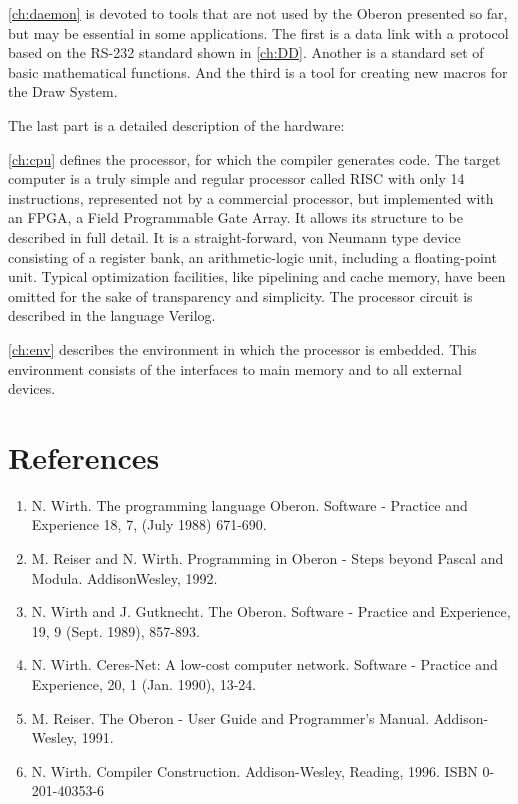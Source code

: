 \ref{ch:daemon} is devoted to tools that are not used by the Oberon presented so far, but may
be essential in some applications. The first is a data link with a protocol based on the RS-232
standard shown in \ref{ch:DD}. Another is a standard set of basic mathematical functions. And the
third is a tool for creating new macros for the Draw System.

The last part is a detailed description of the hardware:

\ref{ch:cpu} defines
the processor, for which the compiler generates code. The target computer is a truly simple and
regular processor called RISC with only 14 instructions, represented not by a commercial
processor, but implemented with an FPGA, a Field Programmable Gate Array. It allows its
structure to be described in full detail. It is a straight-forward, von Neumann type device consisting
of a register bank, an arithmetic-logic unit, including a floating-point unit. Typical optimization
facilities, like pipelining and cache memory, have been omitted for the sake of transparency and
simplicity. The processor circuit is described in the language Verilog.

\ref{ch:env} describes the environment in which the processor is embedded. This environment
consists of the interfaces to main memory and to all external devices.

\section*{References}
\begin{enumerate}
	\item N. Wirth. The programming language Oberon. Software - Practice and Experience 18, 7, (July 1988) 671-690.
	\item M. Reiser and N. Wirth. Programming in Oberon - Steps beyond Pascal and Modula. AddisonWesley, 1992.
	\item N. Wirth and J. Gutknecht. The Oberon. Software - Practice and Experience, 19, 9 (Sept. 1989), 857-893.
	\item N. Wirth. Ceres-Net: A low-cost computer network. Software - Practice and Experience, 20, 1 (Jan. 1990), 13-24.
	\item M. Reiser. The Oberon - User Guide and Programmer's Manual. Addison-Wesley, 1991.
	\item N. Wirth. Compiler Construction. Addison-Wesley, Reading, 1996. ISBN 0-201-40353-6
\end{enumerate}
